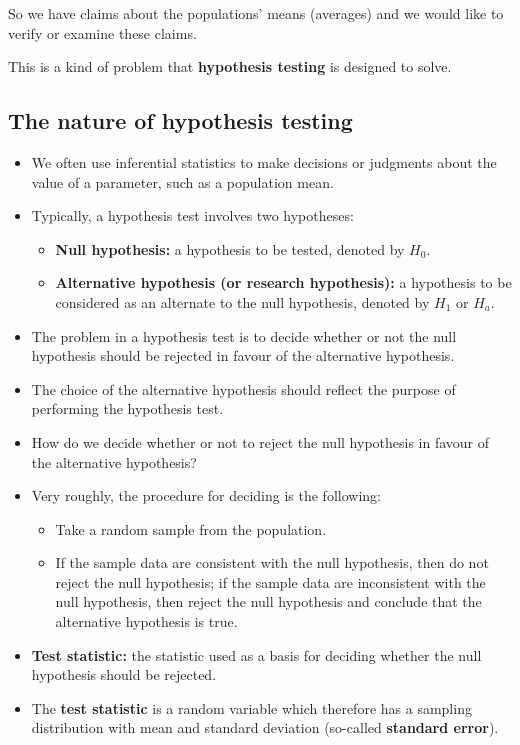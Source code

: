 \documentclass[
]{article}
\providecommand{\tightlist}{%
  \setlength{\itemsep}{0pt}\setlength{\parskip}{0pt}}
\begin{document}
So we have claims about the populations' means (averages) and we would
like to verify or examine these claims.

This is a kind of problem that \textbf{hypothesis testing} is designed
to solve.

\hypertarget{the-nature-of-hypothesis-testing}{%
\subsection{The nature of hypothesis
testing}\label{the-nature-of-hypothesis-testing}}

\begin{itemize}
\item
  We often use inferential statistics to make decisions or judgments
  about the value of a parameter, such as a population mean.
\item
  Typically, a hypothesis test involves two hypotheses:

  \begin{itemize}
  \tightlist
  \item
    \textbf{Null hypothesis:} a hypothesis to be tested, denoted by
    \(H_0\).
  \item
    \textbf{Alternative hypothesis (or research hypothesis):} a
    hypothesis to be considered as an alternate to the null hypothesis,
    denoted by \(H_1\) or \(H_a\).
  \end{itemize}
\item
  The problem in a hypothesis test is to decide whether or not the null
  hypothesis should be rejected in favour of the alternative hypothesis.
\item
  The choice of the alternative hypothesis should reflect the purpose of
  performing the hypothesis test.
\item
  How do we decide whether or not to reject the null hypothesis in
  favour of the alternative hypothesis?
\item
  Very roughly, the procedure for deciding is the following:

  \begin{itemize}
  \tightlist
  \item
    Take a random sample from the population.
  \item
    If the sample data are consistent with the null hypothesis, then do
    not reject the null hypothesis; if the sample data are inconsistent
    with the null hypothesis, then reject the null hypothesis and
    conclude that the alternative hypothesis is true.
  \end{itemize}
\item
  \textbf{Test statistic:} the statistic used as a basis for deciding
  whether the null hypothesis should be rejected.
\item
  The \textbf{test statistic} is a random variable which therefore has a
  sampling distribution with mean and standard deviation (so-called
  \textbf{standard error}).
\end{itemize}
\end{document}
